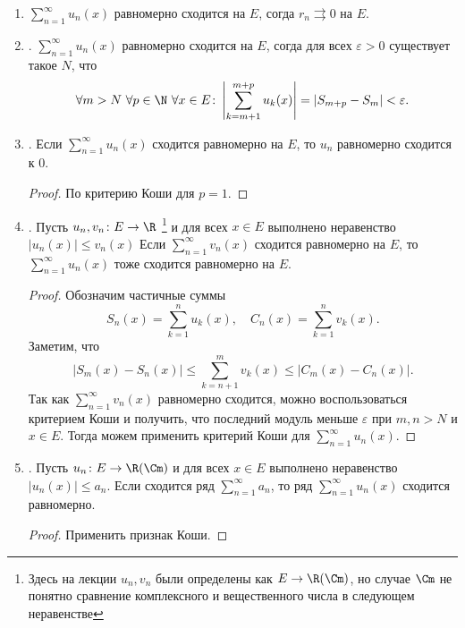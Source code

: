 \begin{prop}
	$ $
	\begin{enumerate}
		\item
			$ \sum_{n=1}^{\infty} u_n(x)$ равномерно сходится на $ E$, согда $ r_n \rightrightarrows 0$ на $ E$.
		\item  {}. $ \sum_{n=1}^{\infty} u_n(x)$ равномерно сходится на $ E$, согда для всех $ \varepsilon  >0$ существует такое $ N$, что
			\[
				\forall m > N ~ \forall p \in  \N ~ \forall x \in  E\colon \left| \sum_{k=m+1}^{m+p} u_k(x) \right| =\left|S_{m+p} -S_m\right|< \varepsilon
			.\]
		\item {}.
			Если $\sum_{n=1}^{\infty} u_n(x)$ сходится равномерно на $ E$, то $ u_n$ равномерно сходится к 0.
			\begin{proof}
				По критерию Коши для $ p = 1$.
			\end{proof}
		\item {}. Пусть $ u_n, v_n \colon E \to  \R$ \footnote{Здесь на лекции $u_n, v_n$ были определены как $ E \to \R(\Cm)$, но случае $\Cm$ не понятно сравнение комплексного и вещественного числа в следующем неравенстве} и для всех $ x \in E$ выполнено неравенство $ \lvert u_n(x) \rvert \le v_n(x)$
			Если $ \sum_{n=1}^{\infty} v_n(x)$ сходится равномерно на $ E$, то  $ \sum_{n=1}^{\infty} u_n(x)$ тоже сходится равномерно на $ E$.
			\begin{proof}
				Обозначим частичные суммы
				\[
					S_n (x) = \sum_{k=1}^{n}  u_k(x), \quad C_n(x) = \sum_{k=1}^{n} v_k(x)
				.\]
				Заметим, что
				\[
					\left| S_m(x) - S_n(x) \right|  \le  \sum_{k=n+1}^{m} v_k(x) \le \left| C_m(x) - C_n(x) \right|
				.\]
				Так как $ \sum_{n=1}^{\infty} v_n(x)$ равномерно сходится, можно воспользоваться критерием Коши и получить, что последний модуль  меньше $ \varepsilon $ при $ m, n > N$ и  $ x \in E$. Тогда можем применить критерий Коши для $ \sum_{n=1}^{\infty} u_n(x)$.
			\end{proof}

		\item {}. Пусть $ u_n\colon E \to  \R(\Cm)$ и для всех $ x \in E$ выполнено неравенство $ \lvert u_n(x)  \rvert \le a_n$. Если сходится ряд $ \sum_{n=1}^{\infty} a_n$, то ряд $ \sum_{n=1}^{\infty} u_n(x)$ сходится равномерно.
			\begin{proof}
				Применить признак Коши.
			\end{proof}


\end{enumerate}
\end{prop}

